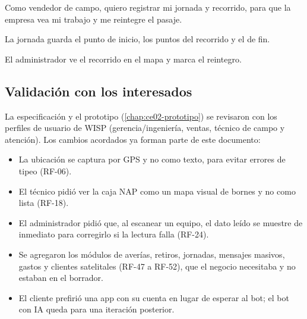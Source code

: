 {Como vendedor de campo, quiero registrar mi jornada y recorrido, para que la empresa
vea mi trabajo y me reintegre el pasaje.}
{\item La jornada guarda el punto de inicio, los puntos del recorrido y el de fin.
 \item El administrador ve el recorrido en el mapa y marca el reintegro.}

\subsection{Validación con los interesados}
\label{sec:ce02-validacion}

La especificación y el prototipo (\cref{chap:ce02-prototipo}) se revisaron con los
perfiles de usuario de WISP (gerencia/ingeniería, ventas, técnico de campo y atención).
Los cambios acordados ya forman parte de este documento:

\begin{itemize}
  \item La ubicación se captura por GPS y no como texto, para evitar errores de tipeo (RF-06).
  \item El técnico pidió ver la caja NAP como un mapa visual de bornes y no como lista (RF-18).
  \item El administrador pidió que, al escanear un equipo, el dato leído se muestre
  de inmediato para corregirlo si la lectura falla (RF-24).
  \item Se agregaron los módulos de averías, retiros, jornadas, mensajes masivos,
  gastos y clientes satelitales (RF-47 a RF-52), que el negocio necesitaba y no
  estaban en el borrador.
  \item El cliente prefirió una app con su cuenta en lugar de esperar al bot; el bot
  con IA queda para una iteración posterior.
\end{itemize}


